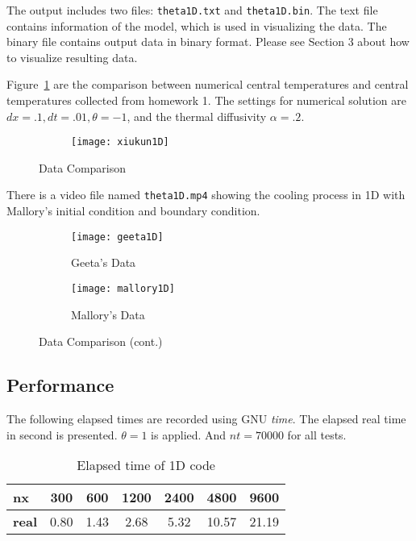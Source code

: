\documentclass[letterpaper,12pt,fleqn]{article}
\begin{document}
The output includes two files: \texttt{theta1D.txt} and \texttt{theta1D.bin}.
The text file contains information of the model, which is used in visualizing the data.
The binary file contains output data in binary format.
Please see Section 3 about how to visualize resulting data.

Figure~\ref{fig:data-comp-1d} are the comparison between numerical central temperatures and central temperatures collected from homework 1.
The settings for numerical solution are $dx=.1, dt=.01, \theta=-1$, and the thermal diffusivity $\alpha=.2$.

\begin{figure}[H]
  \begin{subfigure}[b]{\textwidth}
    \centering
    \texttt{[image: xiukun1D]}
  \end{subfigure}
  \caption{Data Comparison}
\end{figure}
There is a video file named \texttt{theta1D.mp4} showing the cooling process in 1D with Mallory's initial condition and boundary condition.
\begin{figure}[H]\ContinuedFloat
  \begin{subfigure}[b]{\textwidth}
    \centering
    \texttt{[image: geeta1D]}
    \caption{Geeta's Data}
  \end{subfigure}

  \begin{subfigure}[b]{\textwidth}
    \centering
    \texttt{[image: mallory1D]}
    \caption{Mallory's Data}
  \end{subfigure}
  \caption{Data Comparison (cont.)}
  \label{fig:data-comp-1d}
\end{figure}


\subsection{Performance}
The following elapsed times are recorded using GNU \textit{time}. 
The elapsed real time in second is presented.
$\theta=1$ is applied. And $nt=70000$ for all tests.

\begin{table}[H]
  \centering
  \begin{tabular}{l c c c c c c}
    \toprule
    \textbf{nx} & 300 & 600 & 1200 & 2400 & 4800 & 9600\\
    \midrule
    \textbf{real} & 0.80 & 1.43 & 2.68 & 5.32 & 10.57 & 21.19\\
    \bottomrule
  \end{tabular}
  \caption{Elapsed time of 1D code}
  \label{tab:time-1d}
\end{table}
\end{document}
